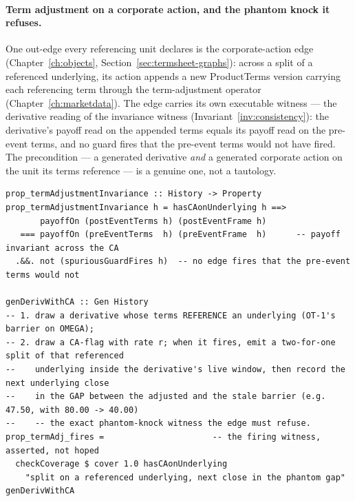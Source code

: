 \paragraph{Term adjustment on a corporate action, and the phantom knock it refuses.}
One out-edge every referencing unit declares is the corporate-action edge
(Chapter~\ref{ch:objects}, Section~\ref{sec:termsheet-graphs}): across a split of a referenced
underlying, its action appends a new ProductTerms version carrying each referencing term
through the term-adjustment operator (Chapter~\ref{ch:marketdata}). The edge carries its own
executable witness --- the derivative reading of the invariance witness
(Invariant~\ref{inv:consistency}): the derivative's payoff read on the appended terms equals
its payoff read on the pre-event terms, and no guard fires that the pre-event terms would not
have fired. The precondition --- a generated derivative \emph{and} a generated corporate action
on the unit its terms reference --- is a genuine one, not a tautology.

\begin{lstlisting}
prop_termAdjustmentInvariance :: History -> Property
prop_termAdjustmentInvariance h = hasCAonUnderlying h ==>
       payoffOn (postEventTerms h) (postEventFrame h)
   === payoffOn (preEventTerms  h) (preEventFrame  h)      -- payoff invariant across the CA
  .&&. not (spuriousGuardFires h)  -- no edge fires that the pre-event terms would not

genDerivWithCA :: Gen History
-- 1. draw a derivative whose terms REFERENCE an underlying (OT-1's barrier on OMEGA);
-- 2. draw a CA-flag with rate r; when it fires, emit a two-for-one split of that referenced
--    underlying inside the derivative's live window, then record the next underlying close
--    in the GAP between the adjusted and the stale barrier (e.g. 47.50, with 80.00 -> 40.00)
--    -- the exact phantom-knock witness the edge must refuse.
prop_termAdj_fires =                      -- the firing witness, asserted, not hoped
  checkCoverage $ cover 1.0 hasCAonUnderlying
    "split on a referenced underlying, next close in the phantom gap" genDerivWithCA
\end{lstlisting}

